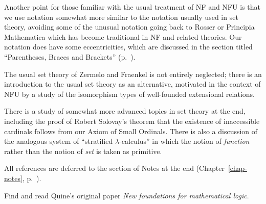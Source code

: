 Another point for those familiar with the usual treatment of
NF and NFU is that we use notation somewhat more
similar to the notation usually used in set theory, avoiding some of
the unusual notation going back to Rosser or Principia Mathematica
which has become traditional in NF and related theories.  Our
notation does have some eccentricities, which are discussed in the
section titled ``Parentheses, Braces and Brackets'' (p.~\pageref{sec-par}).

The usual set theory of Zermelo and
Fraenkel 
is not entirely neglected; there is an introduction to the usual set
theory as an alternative, motivated in the context of NFU by a
study of the isomorphism types of well-founded extensional relations.

There is a study of somewhat more advanced topics in set
theory at the end, including the proof of Robert Solovay's theorem
that the existence of inaccessible
cardinals follows from our Axiom of Small
Ordinals.  There is also a discussion of the
analogous system of ``stratified $\lambda$-calculus'' in
which the notion of {\itshape function\/} rather than the notion of {\itshape
set\/} is taken as primitive.

All references are deferred to the section of Notes at the end
(Chapter~\ref{chap-notes}, p.~\pageref{chap-notes}).


\Exercise

Find and read Quine's original paper {\itshape New foundations for mathematical
logic}.
